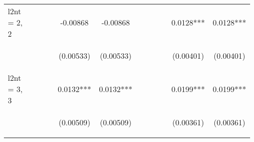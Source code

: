 \documentclass[]{article}
\begin{document}
\begin{center}
\begin{tabular}{lccccccccccc}
l2nt = 2, 2 &  &  &  & -0.00868 & -0.00868 &  &  &  &  & 0.0128*** & 0.0128*** \\
\vspace{4pt} & \begin{footnotesize}\end{footnotesize} & \begin{footnotesize}\end{footnotesize} & \begin{footnotesize}\end{footnotesize} & \begin{footnotesize}(0.00533)\end{footnotesize} & \begin{footnotesize}(0.00533)\end{footnotesize} & \begin{footnotesize}\end{footnotesize} & \begin{footnotesize}\end{footnotesize} & \begin{footnotesize}\end{footnotesize} & \begin{footnotesize}\end{footnotesize} & \begin{footnotesize}(0.00401)\end{footnotesize} & \begin{footnotesize}(0.00401)\end{footnotesize} \\
l2nt = 3, 3 &  &  &  & 0.0132*** & 0.0132*** &  &  &  &  & 0.0199*** & 0.0199*** \\
\vspace{4pt} & \begin{footnotesize}\end{footnotesize} & \begin{footnotesize}\end{footnotesize} & \begin{footnotesize}\end{footnotesize} & \begin{footnotesize}(0.00509)\end{footnotesize} & \begin{footnotesize}(0.00509)\end{footnotesize} & \begin{footnotesize}\end{footnotesize} & \begin{footnotesize}\end{footnotesize} & \begin{footnotesize}\end{footnotesize} & \begin{footnotesize}\end{footnotesize} & \begin{footnotesize}(0.00361)\end{footnotesize} & \begin{footnotesize}(0.00361)\end{footnotesize} \\

\end{tabular}
\end{center}
\end{document}
